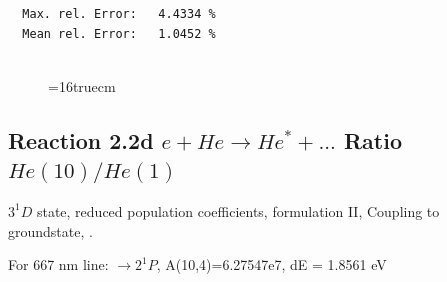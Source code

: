 \documentclass[12pt,dvips]{article}
\begin{document}
\begin{small}
\begin{verbatim}
  Max. rel. Error:   4.4334 %
  Mean rel. Error:   1.0452 %


\end{verbatim}\end{small}
\begin{figure} \label{2.2c}
\epsfxsize=16truecm
\end{figure}
\newpage


\subsection{
  Reaction 2.2d $e + He \rightarrow He^* + ... $ Ratio $He(10)/He(1)$
}

  $3^1D$ state,
  reduced population coefficients, formulation II,
  Coupling to groundstate, \cite{kn:Fujimoto}.

  For 667 nm line: $\rightarrow 2^1P$, A(10,4)=6.27547e7, dE = 1.8561 eV
\end{document}
